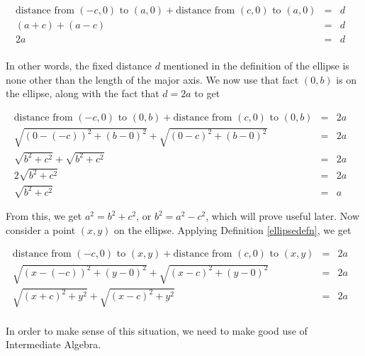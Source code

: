 \documentclass{ximera}
\begin{document}
\[ \begin{array}{rclr} \mbox{distance from $(-c,0)$ to $(a,0)$} + \mbox{distance from $(c,0)$ to $(a,0)$} & = & d & \\ (a+c) + (a-c) & = & d & \\ 2a & = & d \\ \end{array}\]

 

In other words, the fixed distance $d$ mentioned in the definition of the ellipse is none other than the length of the major axis.  We now use that fact $(0,b)$ is on the ellipse, along with the fact that $d=2a$ to get

\[ \begin{array}{rclr} \mbox{distance from  $(-c,0)$ to $(0,b)$} + \mbox{distance from $(c,0)$ to $(0,b)$} & = & 2a & \\ \sqrt{(0-(-c))^2+(b-0)^2} + \sqrt{(0-c)^2+(b-0)^2} & = & 2a & \\ \sqrt{b^2+c^2}+\sqrt{b^2+c^2} & = & 2a  \\ 2 \sqrt{b^2+c^2} & = & 2a \\ \sqrt{b^2+c^2} & = & a \end{array}\]

 

From this, we get $a^2 = b^2 + c^2$, or $b^2 = a^2 - c^2$, which will prove useful later.  Now consider a point $(x,y)$ on the ellipse.  Applying Definition \ref{ellipsedefn}, we get


\[ \begin{array}{rclr} \mbox{distance from  $(-c,0)$ to $(x,y)$} + \mbox{distance from $(c,0)$ to $(x,y)$} & = & 2a & \\ \sqrt{(x-(-c))^2+(y-0)^2} + \sqrt{(x-c)^2+(y-0)^2} & = & 2a & \\ \sqrt{(x+c)^2+y^2}+\sqrt{(x-c)^2+y^2} & = & 2a  \\ \end{array}\]

 

In order to make sense of this situation, we need to make good use of Intermediate Algebra.
\end{document}
